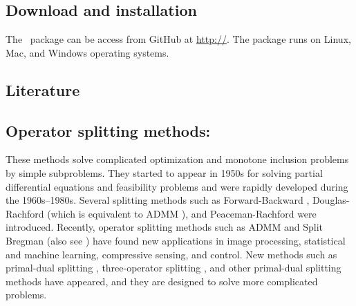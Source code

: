 
\subsection{Download and installation}
The \pkg~package can be access from GitHub at \url{http://}. The package runs on Linux, Mac, and Windows operating systems. 
\subsection{Literature}
\subsection*{Operator splitting methods:}  These methods solve complicated optimization and monotone inclusion problems by simple subproblems. They started to appear in 1950s for  solving partial differential equations and feasibility problems and were rapidly developed during the 1960s--1980s. Several splitting methods such as Forward-Backward \citep{Passty1979_ergodic}, Douglas-Rachford \citep{DR56} (which is equivalent to ADMM \citep{GabayMercier1976_dual,GlowinskiMarroco1975_approximation}), and Peaceman-Rachford \citep{PR} were introduced. Recently,
operator splitting methods such as ADMM and Split Bregman \citep{GoldsteinOsher2009_split} (also see \citep{WangYangYinZhang2008_NewAlternating}) have found new applications in image processing,
statistical and machine learning, compressive sensing, and control. New methods such as primal-dual splitting \citep{Condat2013_primaldual,Vu2013_splitting}, three-operator splitting \citep{DavisYin2015_threeoperator}, and other primal-dual splitting methods \citep{ChenHuangZhang2016_primaldual,ChenHuangZhang2016_primalduala,LiShenXuZhang2015_multistep} have appeared, and they are designed to solve more complicated problems.


